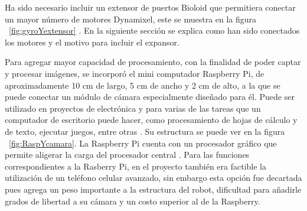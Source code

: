 Ha sido necesario incluir un extensor de puertos Bioloid que permitiera conectar un mayor n\'umero de motores Dynamixel, este se muestra en la figura ~\ref{fig:gyroYextensor} \cite{hub}. En la siguiente secci\'on se explica como han sido conectados los motores y el motivo para incluir el expansor. 


Para agregar mayor capacidad de procesamiento, con la finalidad de poder captar y procesar imágenes, se incorpor\'o el mini computador Raspberry Pi, de aproximadamente 10 cm de largo, 5 cm de ancho y 2 cm de alto, a la que se puede conectar un módulo de cámara especialmente diseñado para él. Puede ser utilizado en proyectos de electrónica y para varias de las tareas que un computador de escritorio puede hacer, como procesamiento de hojas de cálculo y de texto, ejecutar juegos, entre otras \cite{raspberry}. Su estructura se puede ver en la figura ~\ref{fig:RaspYcamara}. La Raspberry Pi cuenta con un procesador gráfico que permite aligerar la carga del procesador central \cite{elLinux}. Para las funciones correspondientes a la Rasberry Pi, en el proyecto tambi\'en era factible la utilizaci\'on de un tel\'efono celular avanzado, sin embargo esta opci\'on fue decartada pues agrega un peso importante a la estructura del robot, dificultad para añadirle grados de libertad a su cámara y un costo superior al de la Raspberry.  

